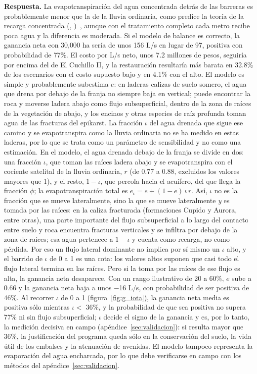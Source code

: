 \documentclass[11pt,letterpaper]{article}
\makeatletter
\newcommand{\citap}[1]{(\@nameuse{cautor@#1}, \@nameuse{canio@#1})~\cite{#1}}
\newcommand{\respuesta}[1]{\begin{cajarespuesta}\textbf{\color{naranja}Respuesta.} #1\end{cajarespuesta}}
\makeatother
\begin{document}
\respuesta{La evapotranspiración del agua concentrada detrás de las barreras es probablemente menor que la de la lluvia ordinaria, como predice la teoría de la recarga concentrada \citap{scanlon2006}, aunque con el tratamiento completo cada metro recibe poca agua y la diferencia es moderada. Si el modelo de balance es correcto, la ganancia neta con 30,000 ha sería de unos 156 L/s en lugar de 97, positiva con probabilidad de 77\%. El costo por L/s neto, unos 7.2 millones de pesos, seguiría por encima del de El Cuchillo II, y la restauración resultaría más barata en 32.8\% de los escenarios con el costo supuesto bajo y en 4.1\% con el alto. El modelo es simple y probablemente subestima $e$: en laderas calizas de suelo somero, el agua que drena por debajo de la franja no siempre baja en vertical; puede encontrar la roca y moverse ladera abajo como flujo subsuperficial, dentro de la zona de raíces de la vegetación de abajo, y los encinos y otras especies de raíz profunda toman agua de las fracturas del epikarst. La fracción $\iota$ del agua drenada que sigue ese camino y se evapotranspira como la lluvia ordinaria no se ha medido en estas laderas, por lo que se trata como un parámetro de sensibilidad y no como una estimación. En el modelo, el agua drenada debajo de la franja se divide en dos: una fracción $\iota$, que toman las raíces ladera abajo y se evapotranspira con el cociente satelital de la lluvia ordinaria, $r$ (de 0.77 a 0.88, excluidos los valores mayores que 1), y el resto, $1-\iota$, que percola hacia el acuífero, del que llega la fracción $\phi$; la evapotranspiración total es $e_\iota = e+(1-e)\,\iota\,r$. Así, $\iota$ no es la fracción que se mueve lateralmente, sino la que se mueve lateralmente \emph{y} es tomada por las raíces: en la caliza fracturada (formaciones Cupido y Aurora, entre otras), una parte importante del flujo subsuperficial a lo largo del contacto entre suelo y roca encuentra fracturas verticales y se infiltra por debajo de la zona de raíces; esa agua pertenece a $1-\iota$ y cuenta como recarga, no como pérdida. Por eso un flujo lateral dominante no implica por sí mismo un $\iota$ alto, y el barrido de $\iota$ de 0 a 1 es una cota: los valores altos suponen que casi todo el flujo lateral termina en las raíces. Pero si la toma por las raíces de ese flujo es alta, la ganancia neta desaparece. Con un rango ilustrativo de 20 a 60\%, $e$ sube a 0.66 y la ganancia neta baja a unos −16 L/s, con probabilidad de ser positiva de 46\%. Al recorrer $\iota$ de 0 a 1 (figura~\ref{fig:g_iota}), la ganancia neta media es positiva sólo mientras $\iota<$ 36\%, y la probabilidad de que sea positiva no supera 77\% ni sin flujo subsuperficial; $\iota$ decide el signo de la ganancia y es, por lo tanto, la medición decisiva en campo (apéndice~\ref{sec:validacion}): si resulta mayor que 36\%, la justificación del programa queda sólo en la conservación del suelo, la vida útil de los embalses y la atenuación de avenidas. El modelo tampoco representa la evaporación del agua encharcada, por lo que debe verificarse en campo con los métodos del apéndice~\ref{sec:validacion}.}
\end{document}
